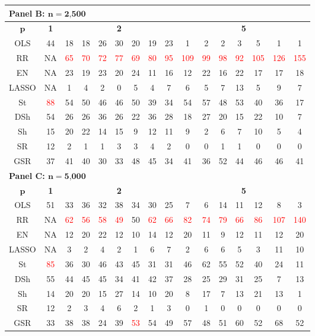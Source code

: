 \begin{table}
{\begin{tabular*}{\textwidth}{@{\extracolsep{\fill}}c|c|ccccccc|ccccccc@{}}
\multicolumn{16}{l}{\textbf{Panel B: $\bm n=\textbf{2,500}$}}\\
\hline
$\bm p$ & \textbf{1} & \multicolumn{7}{c|}{\textbf{2}} & \multicolumn{7}{c}{\textbf{5}} \\
\hline
OLS & 44 & 18 & 18 & 26 & 30 & 20 & 19 & 23 & 1 & 2 & 2 & 3 & 5 & 1 & 1 \\
RR & NA & \textcolor{red}{65} & \textcolor{red}{70} & \textcolor{red}{72} & \textcolor{red}{77} & \textcolor{red}{69} & \textcolor{red}{80} & \textcolor{red}{95} & \textcolor{red}{109} & \textcolor{red}{99} & \textcolor{red}{98} & \textcolor{red}{92} & \textcolor{red}{105} & \textcolor{red}{126} & \textcolor{red}{155} \\
EN & NA & 23 & 19 & 23 & 20 & 24 & 11 & 16 & 12 & 22 & 16 & 22 & 17 & 17 & 18 \\
LASSO & NA & 1 & 4 & 2 & 0 & 5 & 4 & 7 & 6 & 5 & 7 & 13 & 5 & 9 & 7 \\
St & \textcolor{red}{88} & 54 & 50 & 46 & 46 & 50 & 39 & 34 & 54 & 57 & 48 & 53 & 40 & 36 & 17 \\
DSh & 54 & 26 & 26 & 36 & 26 & 22 & 36 & 28 & 18 & 27 & 20 & 15 & 22 & 10 & 7 \\
Sh & 15 & 20 & 22 & 14 & 15 & 9 & 12 & 11 & 9 & 2 & 6 & 7 & 10 & 5 & 4 \\
SR & 12 & 2 & 1 & 1 & 3 & 3 & 4 & 2 & 0 & 0 & 1 & 1 & 0 & 0 & 0 \\
GSR & 37 & 41 & 40 & 30 & 33 & 48 & 45 & 34 & 41 & 36 & 52 & 44 & 46 & 46 & 41 \\
\hline

\multicolumn{16}{l}{\textbf{Panel C: $\bm n=\textbf{5,000}$}}\\
\hline
$\bm p$ & \textbf{1} & \multicolumn{7}{c|}{\textbf{2}} & \multicolumn{7}{c}{\textbf{5}} \\
\hline
OLS & 51 & 33 & 36 & 32 & 38 & 34 & 30 & 25 & 7 & 6 & 14 & 11 & 12 & 8 & 3 \\
RR & NA & \textcolor{red}{62} & \textcolor{red}{56} & \textcolor{red}{58} & \textcolor{red}{49} & 50 & \textcolor{red}{62} & \textcolor{red}{66} & \textcolor{red}{82} & \textcolor{red}{74} & \textcolor{red}{79} & \textcolor{red}{66} & \textcolor{red}{86} & \textcolor{red}{107} & \textcolor{red}{140} \\
EN & NA & 12 & 20 & 22 & 12 & 10 & 14 & 12 & 20 & 11 & 9 & 12 & 11 & 12 & 20 \\
LASSO & NA & 3 & 2 & 4 & 2 & 1 & 6 & 7 & 2 & 6 & 6 & 5 & 3 & 11 & 10 \\
St & \textcolor{red}{85} & 36 & 30 & 46 & 43 & 45 & 31 & 31 & 46 & 62 & 55 & 52 & 40 & 24 & 11 \\
DSh & 55 & 44 & 45 & 45 & 34 & 41 & 42 & 37 & 28 & 25 & 29 & 31 & 25 & 7 & 13 \\
Sh & 14 & 20 & 20 & 15 & 27 & 14 & 10 & 20 & 8 & 17 & 7 & 13 & 21 & 13 & 1 \\
SR & 12 & 2 & 3 & 4 & 6 & 2 & 1 & 3 & 0 & 1 & 0 & 0 & 0 & 0 & 0 \\
GSR & 33 & 38 & 38 & 24 & 39 & \textcolor{red}{53} & 54 & 49 & 57 & 48 & 51 & 60 & 52 & 68 & 52 \\
\hline
\end{tabular*}
}


\end{table}

